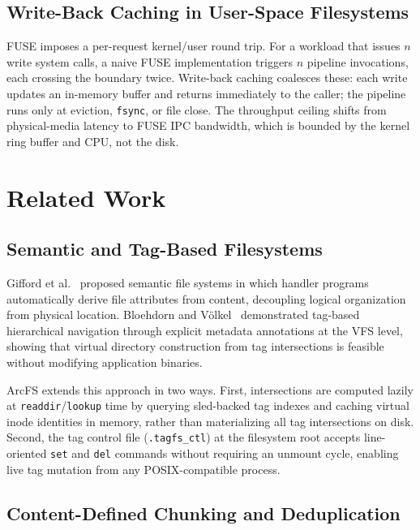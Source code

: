 \documentclass[journal]{IEEEtran}
\begin{document}
\subsection{Write-Back Caching in User-Space Filesystems}

FUSE imposes a per-request kernel/user round trip.  For a workload that
issues $n$ write system calls, a naive FUSE implementation triggers $n$
pipeline invocations, each crossing the boundary twice.  Write-back
caching coalesces these: each write updates an in-memory buffer and
returns immediately to the caller; the pipeline runs only at eviction,
\texttt{fsync}, or file close.  The throughput ceiling shifts from
physical-media latency to FUSE IPC bandwidth, which is bounded by the
kernel ring buffer and CPU, not the disk.

\section{Related Work}

\subsection{Semantic and Tag-Based Filesystems}

Gifford et al.~\cite{gifford1991semantic} proposed semantic file systems
in which handler programs automatically derive file attributes from content,
decoupling logical organization from physical location. Bloehdorn and
V\"{o}lkel~\cite{bloehdorn2006tagfs} demonstrated tag-based hierarchical
navigation through explicit metadata annotations at the VFS level, showing
that virtual directory construction from tag intersections is feasible
without modifying application binaries.

ArcFS extends this approach in two ways. First, intersections are computed
lazily at \texttt{readdir}/\texttt{lookup} time by querying sled-backed tag
indexes and caching virtual inode identities in memory, rather than
materializing all tag intersections on disk.  Second, the tag control file
(\texttt{.tagfs\_ctl}) at the filesystem root accepts line-oriented
\texttt{set} and \texttt{del} commands without requiring an unmount cycle,
enabling live tag mutation from any POSIX-compatible process.

\subsection{Content-Defined Chunking and Deduplication}
\end{document}
